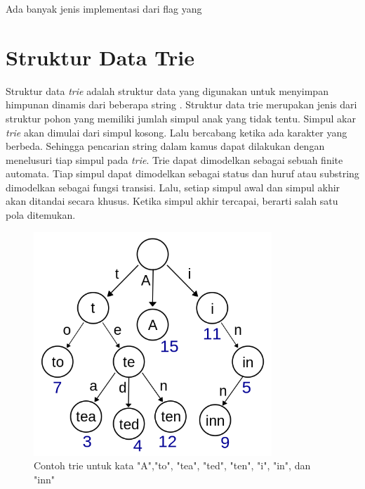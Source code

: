     Ada banyak jenis implementasi dari flag yang 

\section{Struktur Data Trie}

  Struktur data \emph{trie} adalah struktur data yang digunakan untuk menyimpan himpunan dinamis dari beberapa string \citep{trie59}. Struktur data trie merupakan jenis dari struktur pohon yang memiliki jumlah simpul anak yang tidak tentu. 
  Simpul akar \emph{trie} akan dimulai dari simpul kosong. Lalu bercabang ketika ada karakter yang berbeda. Sehingga pencarian string dalam kamus dapat dilakukan dengan menelusuri tiap simpul pada \emph{trie}. Trie dapat dimodelkan sebagai sebuah finite automata. Tiap simpul dapat dimodelkan sebagai status dan huruf atau substring dimodelkan sebagai fungsi transisi. Lalu, setiap simpul awal dan simpul akhir akan ditandai secara khusus. Ketika simpul akhir tercapai, berarti salah satu pola ditemukan.

  \begin{figure}[htb]
      \centering
      \includegraphics[width=0.8\textwidth]{resources/trie.png}
      \caption[Contoh trie untuk kata "A","to", "tea", "ted", "ten", "i", "in", dan "inn"]{Contoh trie untuk kata "A","to", "tea", "ted", "ten", "i", "in", dan "inn"}
    \end{figure}

